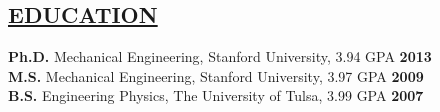 \documentclass[line,margin]{res}
\begin{document}
\begin{resume}
\section{\underline{EDUCATION}}
\vspace{1.0pc}
\textbf{Ph.D.} Mechanical Engineering, Stanford University, 3.94 GPA
\hfill \textbf{2013}%
%
\\[0.0pc]\textbf{M.S.} Mechanical Engineering, Stanford University, 3.97 GPA \hfill  \textbf{2009}
\\[0.0pc]\textbf{B.S.} Engineering Physics, The University of Tulsa, 3.99 GPA \hfill \textbf{2007}
%

%
%

\end{resume}
\end{document}
